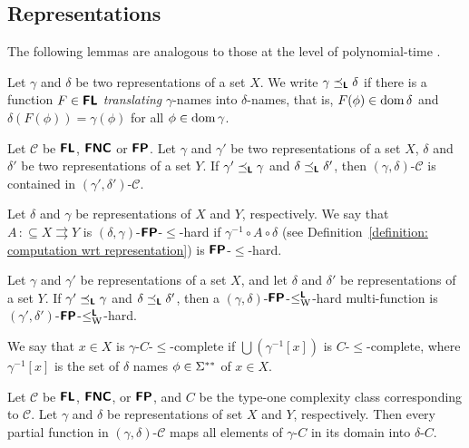 \documentclass[envcountsect,envcountsame,orivec,oribibl]{llncs}
\newcommand{\pcolon}{\mathpunct{\,:\subseteq}}
\begin{document}
\subsection{Representations}
\newcommand{\transL}{\preceq_\classLtwo}

The following lemmas are analogous to 
those at the level of polynomial-time \cite{kawamura2012complexity}. 

\begin{definition}
Let $\gamma$ and $\delta$ be two representations of a set $X$.
We write $\gamma \transL \delta$ if
there is a function $F \in \text{\bfseries \sffamily \upshape FL}$ \emph{translating} $\gamma$-names
into $\delta$-names, that is, 
$F (\phi) \in \mathop{\rm dom} \delta$ and $\delta(F(\phi)) = \gamma (\phi)$ 
for all $\phi \in \mathop{\rm dom} \gamma$.
\end{definition}

\begin{lemma}
 Let $\mathcal{C}$ be $\text{\bfseries \sffamily \upshape FL}$, $\text{\bfseries \sffamily \upshape FNC}$ or
 $\text{\bfseries \sffamily \upshape FP}$.
 Let $\gamma$ and $\gamma'$ be two representations of a set $X$, 
 $\delta$ and $\delta'$ be two representations of a set $Y$.
 If $\gamma' \transL \gamma$ and $\delta \transL \delta'$,
 then $(\gamma, \delta)$-$\mathcal C$ is contained in 
 $(\gamma', \delta')$-$\mathcal C$.
\end{lemma}

Let $\delta$ and $\gamma$ be representations of $X$ and $Y$, respectively.
We say that $A \pcolon X \rightrightarrows Y$ is $(\delta, \gamma)$-$\text{\bfseries \sffamily \upshape FP}$-$\le$-hard 
if $\gamma^{-1} \circ A \circ \delta$ 
(see Definition~\ref{definition: computation wrt representation}) 
is $\text{\bfseries \sffamily \upshape FP}$-$\le$-hard.

\begin{lemma}
 Let $\gamma$ and $\gamma'$ be representations of a set $X$, 
 and let $\delta$ and $\delta'$ be representations of a set $Y$.
 If $\gamma' \transL \gamma$ and $\delta \transL \delta'$,
 then a $(\gamma, \delta)$-$\text{\bfseries \sffamily \upshape FP}$-$\leq _{\mathrm W} ^{\text{\bfseries \sffamily \upshape L}}$-hard multi-function is
 $(\gamma', \delta')$-$\text{\bfseries \sffamily \upshape FP}$-$\leq _{\mathrm W} ^{\text{\bfseries \sffamily \upshape L}}$-hard.
\end{lemma}

We say that $x \in X$ is $\gamma$-$C$-$\le$-complete if
$\bigcup(\gamma^{-1}[x])$ is $C$-$\le$-complete,
where $\gamma^{-1}[x]$ is the set of $\delta$ names $\phi \in \Sigma ^{**}$ of $x \in X$.

\begin{lemma}
 Let $\mathcal C$ be $\text{\bfseries \sffamily \upshape FL}$, $\text{\bfseries \sffamily \upshape FNC}$, 
 or $\text{\bfseries \sffamily \upshape FP}$, and $C$ be the type-one complexity class
 corresponding to $\mathcal C$.
 Let $\gamma$ and $\delta$ be representations of set $X$ and $Y$, respectively.
 Then every partial function in $(\gamma, \delta)$-$\mathcal C$
 maps all elements of $\gamma$-$C$ in its domain into $\delta$-$C$. 
\end{lemma}
\end{document}
